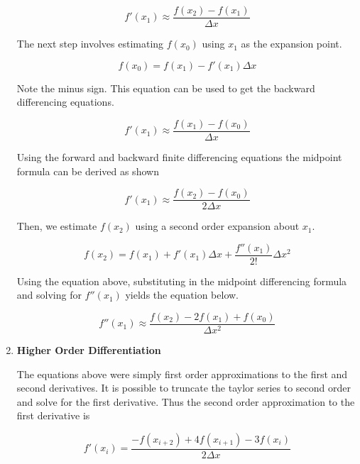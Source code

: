 \begin{enumerate}
    \begin{equation}
      f'(x_{1}) \approx \frac{f(x_{2})-f(x_{1})}{\Delta x}
    \end{equation}

    The next step involves estimating $f(x_0)$ using $x_1$ as the
    expansion point. 

    \begin{equation}
      f(x_0) = f(x_1) - f'(x_1)\Delta x
    \end{equation}

    Note the minus sign. This equation can be used to get the backward
    differencing equations. 

    \begin{equation}
      f'(x_{1}) \approx \frac{f(x_{1})-f(x_{0})}{\Delta x}
    \end{equation}

    Using the forward and backward finite differencing equations the
    midpoint formula can be derived as shown

    \begin{equation}
      f'(x_{1}) \approx \frac{f(x_{2})-f(x_{0})}{2 \Delta x}
    \end{equation}

    Then, we estimate $f(x_2)$ using a second order expansion about
    $x_1$.

    \begin{equation}
      f(x_2) = f(x_1) + f'(x_1)\Delta x + \frac{f''(x_1)}{2!}\Delta
      x^2
    \end{equation}

    Using the equation above, substituting in the midpoint
    differencing formula and solving for $f''(x_1)$ yields the
    equation below.

    \begin{equation}
      f''(x_{1}) \approx \frac{f(x_{2}) -2 f(x_{1}) +
        f(x_0)}{\Delta x^2}
    \end{equation}
      

  \item {\bf Higher Order Differentiation}

    The equations above were simply first order approximations to the
    first and second derivatives. It is possible to truncate the
    taylor series to second order and solve for the first
    derivative. Thus the second order approximation to the first
    derivative is

    \begin{equation}
      f'(x_i) = \frac{-f(x_{i+2})+4f(x_{i+1})-3f(x_i)}{2\Delta x}
    \end{equation}


\end{enumerate}
